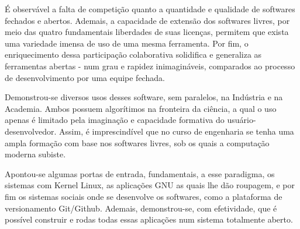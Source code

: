 \documentclass[
12pt,				%
openright,			%
oneside,			%
a4paper,			%
english,			%
french,				%
spanish,			%
brazil,				%
]{abntex2}
\begin{document}
É observável a falta de competição quanto a quantidade e qualidade de
softwares fechados e abertos. Ademais, a capacidade de
extensão dos softwares livres, por meio das quatro fundamentais
liberdades de suas licenças, permitem que exista uma variedade imensa
de uso de uma mesma ferramenta. Por fim, o enriquecimento dessa
participação colaborativa solidifica e generaliza as ferramentas
abertas - num grau e rapidez inimagináveis, comparados ao processo de
desenvolvimento por uma equipe fechada.

Demonstrou-se diversos usos desses software, sem paralelos, na
Indústria e na Academia. Ambos possuem algorítimos na fronteira da
ciência, a qual o uso apenas é limitado pela imaginação e capacidade
formativa do usuário-desenvolvedor. Assim, é imprescindível que no
curso de engenharia se tenha uma ampla formação com base nos softwares
livres, sob os quais a computação moderna subiste.

Apontou-se algumas portas de entrada, fundamentais, a esse paradigma,
os sistemas com Kernel Linux, as aplicações GNU as quais lhe dão
roupagem, e por fim os sistemas sociais onde se desenvolve os
softwares, como a plataforma de versionamento Git/Github. Ademais,
demonstrou-se, com efetividade, que é possível construir e rodas todas
essas aplicações num sistema totalmente aberto.


\end{document}

